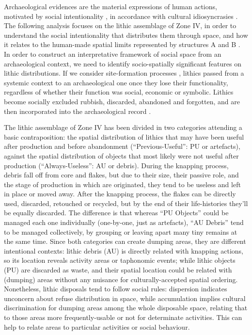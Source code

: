 
Archaeological evidences are the material expressions of human actions, motivated by social intentionality \parencite{Barceló_2002}, in accordance with cultural idiosyncrasies \parencite{Otte_2012}. The following analysis focuses on the lithic assemblage of Zone IV, in order to understand the social intentionality that distributes them through space, and how it relates to the human-made spatial limits represented by structures A and B \parencites{Kooyman_2006}{Maximiano_2008}. In order to construct an interpretative framework of social space from an archaeological context, we need to identify socio-spatially significant features on lithic distributions. If we consider site-formation processes \parencite[cf.][]{Schiffer_1976}, lithics passed from a systemic context to an archaeological one once they lose their functionality, regardless of whether their function was social, economic or symbolic. Lithics become socially excluded rubbish, discarded, abandoned and forgotten, and are then incorporated into the archaeological record \parencites{Clark_1991}{Hull_1987}{Murray_1980}{Schiffer_1976}. 

The lithic assemblage of Zone IV has been divided in two categories attending a basic contraposition: the spatial distribution of lithics that may have been useful after production and before abandonment (“Previous-Useful”: PU or artefacts), against the spatial distribution of objects that most likely were not useful after production (“Always-Useless”: AU or debris). During the knapping process, debris fall off from core and flakes, but due to their size, their passive role, and the stage of production in which are originated, they tend to be useless and left in place or moved away. After the knapping process, the flakes can be directly used, discarded, retouched or recycled, but by the end of their life-histories they’ll be equally discarded. The difference is that whereas “PU Objects” could be managed each one individually (one-by-one, just as artefacts), “AU Debris” tend to be managed collectively, by grouping or leaving apart many tiny remains at the same time. Since both categories can create dumping areas, they are different intentional contexts: lithic debris (AU) is directly related with knapping actions, so its location reveals activity areas or taphonomic events; while lithic objects (PU) are discarded as waste, and their spatial location could be related with (dumping) areas without any nuisance for culturally-accepted spatial ordering. Nonetheless, lithic disposals tend to follow social rules: dispersion indicates unconcern about refuse distribution in space, while accumulation implies cultural discrimination for dumping areas among the whole disposable space, relating that to those areas more frequently-usable or not for determinate activities. This can help to relate areas to particular activities or social behaviour.

